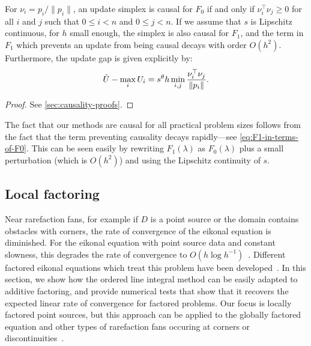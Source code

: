 \documentclass{article}
\begin{document}
\begin{theorem}\label{thm:causality}
  For $\nu_i = p_i/\|p_i\|$, an update simplex is causal for $F_0$ if
  and only if $\nu_i^\top \nu_j \geq 0$ for all $i$ and $j$ such that
  $0 \leq i < n$ and $0 \leq j < n$. If we assume that $s$ is
  Lipschitz continuous, for $h$ small enough, the simplex is also
  causal for $F_1$, and the term in $F_1$ which prevents an update
  from being causal decays with order $O(h^2)$. Furthermore, the
  update gap is given explicitly by:
  \begin{equation}
    \hat{U} - \max_i U_i = s^\theta h \min_{i, j} \frac{\nu_i^\top \nu_j}{\left\|p_i\right\|}.
  \end{equation}
\end{theorem}

\begin{proof}
  See \cref{sec:causality-proofs}.
\end{proof}

\noindent The fact that our methods are causal for all practical
problem sizes follows from the fact that the term preventing causality
decays rapidly---see \cref{eq:F1-in-terms-of-F0}. This can be seen
easily by rewriting $F_1(\lambda)$ as $F_0(\lambda)$ plus a small
perturbation (which is $O(h^2)$) and using the Lipschitz continuity of
$s$.

\subsection{Local factoring}

Near rarefaction fans, for example if $D$ is a point source or the
domain contains obstacles with corners, the rate of convergence of the
eikonal equation is diminished. For the eikonal equation with point
source data and constant slowness, this degrades the rate of
convergence to $O(h \log
h^{-1})$~\cite{qi2018corner,zhao2005fast}. Different factored eikonal
equations which treat this problem have been
developed~\cite{fomel2009fast,luo2012fast}. In this section, we show
how the ordered line integral method can be easily adapted to additive
factoring, and provide numerical tests that show that it recovers the
expected linear rate of convergence for factored problems. Our focus
is locally factored point sources, but this approach can be applied to
the globally factored equation and other types of rarefaction fans
occuring at corners or discontinuities~\cite{qi2018corner}.
\end{document}
